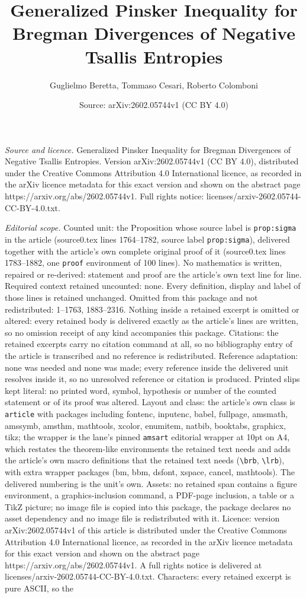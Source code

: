 \documentclass[10pt,a4paper]{amsart}
\title[Generalized Pinsker Inequality for Bregman Divergences of Ne]{Generalized Pinsker Inequality for Bregman Divergences of Negative Tsallis Entropies}
\author{Guglielmo Beretta, Tommaso Cesari, Roberto Colomboni}
\date{Source: arXiv:2602.05744v1 (CC BY 4.0)}
\begin{document}
\maketitle

\noindent\emph{Source and licence.} Generalized Pinsker Inequality for Bregman Divergences of Negative Tsallis Entropies. Version arXiv:2602.05744v1 (CC BY 4.0), distributed under the Creative Commons Attribution 4.0 International licence, as recorded in the arXiv licence metadata for this exact version and shown on the abstract page https://arxiv.org/abs/2602.05744v1. Full rights notice: licenses/arxiv-2602.05744-CC-BY-4.0.txt.\par\smallskip

\noindent\textit{Editorial scope.} Counted unit: the Proposition whose source label is \texttt{prop:sigma} in the article (source0.tex lines 1764--1782, source label \texttt{prop:sigma}), delivered together with the article's own complete original proof of it (source0.tex lines 1783--1882, one \texttt{proof} environment of 100 lines). No mathematics is written, repaired or re-derived: statement and proof are the article's own text line for line. Required context retained uncounted: none. Every definition, display and label of those lines is retained unchanged. Omitted from this package and not redistributed: 1--1763, 1883--2316. Nothing inside a retained excerpt is omitted or altered: every retained body is delivered exactly as the article's lines are written, so no omission receipt of any kind accompanies this package. Citations: the retained excerpts carry no citation command at all, so no bibliography entry of the article is transcribed and no reference is redistributed. Reference adaptation: none was needed and none was made; every reference inside the delivered unit resolves inside it, so no unresolved reference or citation is produced. Printed slips kept literal: no printed word, symbol, hypothesis or number of the counted statement or of its proof was altered. Layout and class: the article's own class is \texttt{article} with packages including fontenc, inputenc, babel, fullpage, amsmath, amssymb, amsthm, mathtools, xcolor, enumitem, natbib, booktabs, graphicx, tikz; the wrapper is the lane's pinned \texttt{amsart} editorial wrapper at 10pt on A4, which restates the theorem-like environments the retained text needs and adds the article's own macro definitions that the retained text needs (\texttt{\textbackslash brb}, \texttt{\textbackslash lrb}), with extra wrapper packages (bm, bbm, dsfont, xspace, cancel, mathtools). The delivered numbering is the unit's own. Assets: no retained span contains a figure environment, a graphics-inclusion command, a PDF-page inclusion, a table or a TikZ picture; no image file is copied into this package, the package declares no asset dependency and no image file is redistributed with it. Licence: version arXiv:2602.05744v1 of this article is distributed under the Creative Commons Attribution 4.0 International licence, as recorded in the arXiv licence metadata for this exact version and shown on the abstract page https://arxiv.org/abs/2602.05744v1. A full rights notice is delivered at licenses/arxiv-2602.05744-CC-BY-4.0.txt. Characters: every retained excerpt is pure ASCII, so the 
\end{document}

